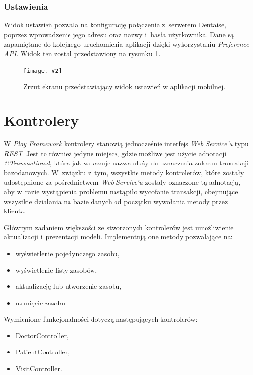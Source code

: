 \documentclass[11pt]{aghdpl}
\newcommand{\customWidthPicture}[3]{
\begin{figure}[h!]
	\centering
		\texttt{[image: \#2]}
	\caption{#3}
	\label{fig:#2}
\end{figure}
}
\begin{document}
\subsubsection{Ustawienia}
\label{sec:ustawieniaMobile}

Widok ustawień pozwala na konfigurację połączenia z~serwerem Dentaise, poprzez wprowadzenie jego adresu oraz nazwy i~hasła użytkownika. Dane są zapamiętane do kolejnego uruchomienia aplikacji dzięki wykorzystaniu \emph{Preference API}. Widok ten został przedstawiony na rysunku \ref{fig:ustawieniaMobile}.

\customWidthPicture{.3}{ustawieniaMobile}{Zrzut ekranu przedstawiający widok ustawień w aplikacji mobilnej.}

\section{Kontrolery}

W \emph{Play Framework} kontrolery stanowią jednocześnie interfejs \emph{Web Service'u} typu \emph{REST}. Jest to również jedyne miejsce, gdzie możliwe jest użycie adnotacji \emph{@Transactional}, która jak wskazuje nazwa służy do oznaczenia zakresu transakcji bazodanowych. W~związku z~tym, wszystkie metody kontrolerów, które zostały udostępnione za pośrednictwem \emph{Web Service'u} zostały oznaczone tą adnotacją, aby w~razie wystąpienia problemu nastąpiło wycofanie transakcji, obejmujące wszystkie działania na bazie danych od początku wywołania metody przez klienta.

Głównym zadaniem większości ze stworzonych kontrolerów jest umożliwienie aktualizacji i~prezentacji modeli. Implementują one metody pozwalające na:

\begin{itemize}
	\item wyświetlenie pojedynczego zasobu,
	\item wyświetlenie listy zasobów,
	\item aktualizację lub utworzenie zasobu,
	\item usunięcie zasobu.
\end{itemize}

Wymienione funkcjonalności dotyczą następujących kontrolerów:

\begin{itemize}
	\item DoctorController,
	\item PatientController,
	\item VisitController.
\end{itemize}
\end{document}
